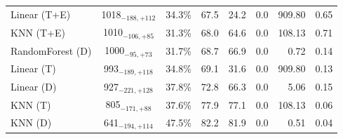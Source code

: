 \begin{tabular}{lcccccrr}
Linear (T+E) & 1018${}_{-188,+112}$ & 34.3\% & 67.5 & 24.2 & 0.0 & 909.80 & 0.65 \\
KNN (T+E) & 1010${}_{-106,+85}$ & 31.3\% & 68.0 & 64.6 & 0.0 & 108.13 & 0.71 \\
RandomForest (D) & 1000${}_{-95,+73}$ & 31.7\% & 68.7 & 66.9 & 0.0 & 0.72 & 0.14 \\
Linear (T) & 993${}_{-189,+118}$ & 34.8\% & 69.1 & 31.6 & 0.0 & 909.80 & 0.13 \\
Linear (D) & 927${}_{-221,+128}$ & 37.8\% & 72.8 & 66.3 & 0.0 & 5.06 & 0.15 \\
KNN (T) & 805${}_{-171,+88}$ & 37.6\% & 77.9 & 77.1 & 0.0 & 108.13 & 0.06 \\
KNN (D) & 641${}_{-194,+114}$ & 47.5\% & 82.2 & 81.9 & 0.0 & 0.51 & 0.04 \\
\bottomrule
\end{tabular}